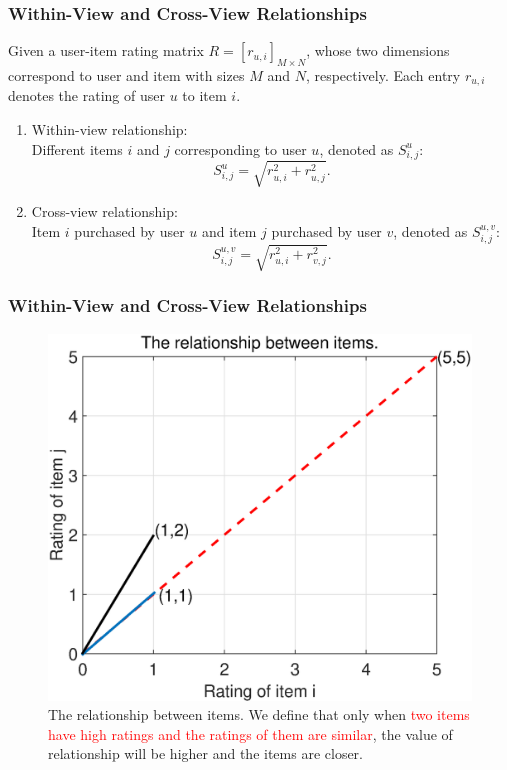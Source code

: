 \documentclass{beamer}
\newcommand{\red}[1]{\textcolor{red}{#1}}%
\begin{document}
\begin{frame}
\frametitle{Within-View and Cross-View Relationships}
Given a user-item rating matrix $R=[r_{u,i}]_{M \times N}$, whose two dimensions correspond to user and item with sizes $M$ and $N$, respectively. Each entry $r_{u,i}$ %
denotes the rating of user $u$ to item $i$.

\begin{enumerate}
\item Within-view relationship:\\
Different items $i$ and $j$ %
corresponding to user $u$, denoted as $S^u_{i,j}$:
\begin{equation}\label{eq:within_view}
  S^u_{i,j} = \sqrt{r_{u,i}^2+r_{u,j}^2}.
\end{equation}
\item Cross-view relationship:\\
Item {$i$} purchased by user $u$ and item $j$ purchased by user $v$, %
denoted as $S^{u,v}_{i,j}$:
\begin{equation}\label{eq:cross_view}
  S^{u,v}_{i,j} = \sqrt{r_{u,i}^2+r_{v,j}^2}.
\end{equation}
\end{enumerate}
\end{frame}

\begin{frame}
\frametitle{Within-View and Cross-View Relationships}
\begin{figure}[!t]
\renewcommand{\subfigcapskip}{-4pt}
\renewcommand{\subfigbottomskip}{0pt}
\centering
\includegraphics[width=0.6\linewidth]{Figures/Relationship.eps}
\caption{The relationship between items. We define that only when \red{two items have high ratings and the ratings of them are similar}, the value of relationship will be higher and the items are closer.}
\label{fig:Relationship}
\end{figure}
\end{frame}
\end{document}
